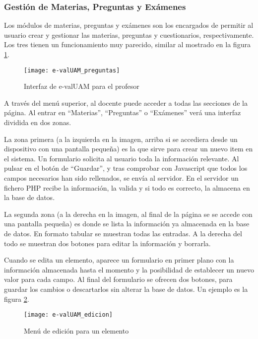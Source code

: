 \subsubsection{Gestión de Materias, Preguntas y Exámenes}

Los módulos de materias, preguntas y exámenes son los encargados de permitir al usuario crear y gestionar las materias, preguntas y cuestionarios, respectivamente. Los tres tienen un funcionamiento muy parecido, similar al mostrado en la figura \ref{fig:e-valUAM interfaz profesor}.

\begin{figure}[htp!]
	\centering
	\texttt{[image: e-valUAM\_preguntas]}
	\caption{Interfaz de e-valUAM para el profesor}
	\label{fig:e-valUAM interfaz profesor}
\end{figure}

A través del menú superior, al docente puede acceder a todas las secciones de la página. Al entrar en ``Materias'', ``Preguntas'' o ``Exámenes'' verá una interfaz dividida en dos zonas. 

La zona primera (a la izquierda en la imagen, arriba si se accediera desde un dispositivo con una pantalla pequeña) es la que sirve para crear un nuevo item en el sistema. Un formulario solicita al usuario toda la información relevante. Al pulsar en el botón de ``Guardar'', y tras comprobar con Javascript que todos los campos necesarios han sido rellenados, se envía al servidor. En el servidor un fichero PHP recibe la información, la valida y si todo es correcto, la almacena en la base de datos.

La segunda zona (a la derecha en la imagen, al final de la página se se accede con una pantalla pequeña) es donde se lista la información ya almacenada en la base de datos. En formato tabular se muestran todas las entradas. A la derecha del todo se muestran dos botones para editar la información y borrarla.

Cuando se edita un elemento, aparece un formulario en primer plano con la información almacenada hasta el momento y la posibilidad de establecer un nuevo valor para cada campo. Al final del formulario se ofrecen dos botones, para guardar los cambios o descartarlos sin alterar la base de datos. Un ejemplo es la figura \ref{fig:e-valUAM edicion profesor}.

\begin{figure}[htp!]
	\centering
	\texttt{[image: e-valUAM\_edicion]}
	\caption{Menú de edición para un elemento}
	\label{fig:e-valUAM edicion profesor}
\end{figure}

